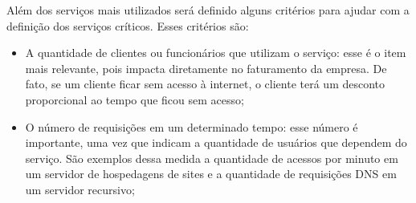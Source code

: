 \newpage
Além dos serviços mais utilizados será definido alguns critérios para ajudar com a definição dos serviços críticos. 
Esses critérios são: 
\begin{itemize}
 \item A quantidade de clientes ou funcionários que utilizam o serviço: esse é o item mais relevante, pois impacta diretamente no faturamento
 da empresa. De fato, se um cliente ficar sem acesso à internet, o cliente terá um desconto proporcional ao tempo que ficou sem acesso; 
 \item O número de requisições em um determinado tempo: esse número é importante, uma vez que indicam a quantidade de usuários que dependem do 
 serviço. São exemplos dessa medida a quantidade de acessos por minuto em um servidor de hospedagens de sites e a quantidade de requisições 
 \ac{DNS} em um servidor recursivo;
\end{itemize}

